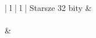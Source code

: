 \begin{center}
\begin{tabular}{ | l | l | }
\hline
	Starsze 32 bity & \PLph{} \\
\hline
{} \\
\hline
{} &  \\
\hline
\end{tabular}
\end{center}

